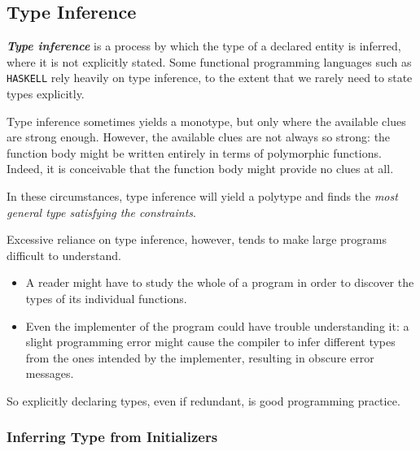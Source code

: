 \subsection{Type Inference}
\label{subsec:type-infer}

\textit{\textbf{Type inference}} is a process by which the type of a declared entity is inferred, where it is not explicitly stated. Some functional programming languages such as \texttt{HASKELL} rely heavily on type inference, to the extent that we rarely need to state types explicitly.

Type inference sometimes yields a monotype, but only where the available clues are strong enough. However, the available clues are not always so strong: the function body might be written entirely in terms of polymorphic functions. Indeed, it is conceivable that the function body might provide no clues at all. 

\noindent In these circumstances, type inference will yield a polytype and finds the \textit{most general type satisfying the constraints}.

Excessive reliance on type inference, however, tends to make large programs difficult to understand. 
\begin{itemize}
  \item A reader might have to study the whole of a program in order to discover the types of its individual functions.
  \item Even the implementer of the program could have trouble understanding it: a slight programming error might cause the compiler to infer different types from the ones intended by the implementer, resulting in obscure error messages.
\end{itemize}
So explicitly declaring types, even if redundant, is good programming practice.

\subsubsection{Inferring Type from Initializers}
\label{subsubsec:infer-type-initializers}

